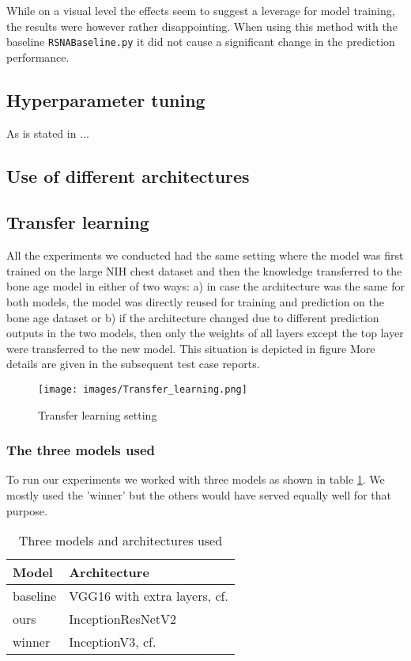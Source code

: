 \documentclass[10pt,twocolumn,letterpaper]{article}
\begin{document}
While on a visual level the effects seem to suggest a leverage for model training, the results were however rather disappointing. When using this method with the baseline \verb+RSNABaseline.py+ it did not cause a significant change in the prediction performance.


\subsection{Hyperparameter tuning}
As is stated in \cite{1802.09596} ...

\subsection{Use of different architectures}

\subsection{Transfer learning}
All the experiments we conducted had the same setting where the model was first trained on the large NIH chest dataset and then the knowledge transferred to the bone age model in either of two ways: a) in case the architecture was the same for both models, the model was directly reused for training and prediction on the bone age dataset or b) if the architecture changed due to different prediction outputs in the two models, then only the weights of all layers except the top layer were transferred to the new model. This situation is depicted in figure More details are given in the subsequent test case reports.

\begin{figure}[h]
\texttt{[image: images/Transfer\_learning.png]}
\centering
\caption{Transfer learning setting}
\label{fig:transferls}
\end{figure}

\subsubsection{The three models used}
To run our experiments we worked with three models as shown in table \ref{table:models}. We mostly used the 'winner' but the others would have served equally well for that purpose.

\begin{table}[h]
\begin{center}
\begin{tabular}{|l|l|}
\hline
Model & Architecture \\
\hline\hline
baseline & VGG16 with extra layers, cf. \cite{kaggleboneage} \\
ours & InceptionResNetV2  \\
winner & InceptionV3, cf. \cite{16bitrsnachallenge} \\
\hline
\end{tabular}
\end{center}
\caption{Three models and architectures used}
\label{table:models}
\end{table}
\end{document}
